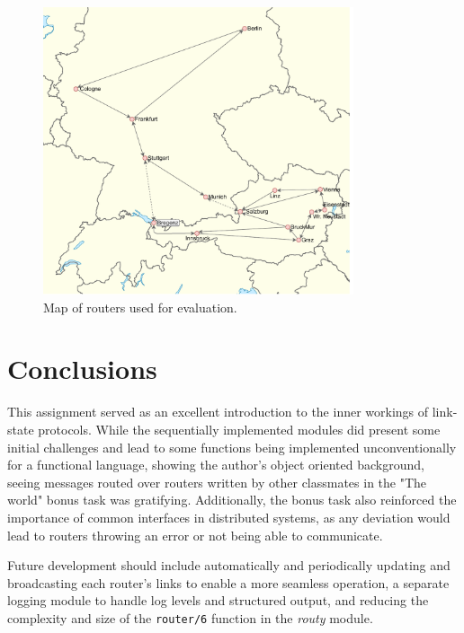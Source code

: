 \documentclass[a4paper, 11pt]{article}
\begin{document}
\begin{figure}[H]
  \begin{center}
    \includegraphics[width=345px]{graphics/map_routy.pdf}
    \caption{Map of routers used for evaluation.}
    \label{fig:map1}
  \end{center}
\end{figure}



\section{Conclusions}

This assignment served as an excellent introduction to the inner workings of link-state protocols.
While the sequentially implemented modules did present some initial challenges and lead to some functions being implemented unconventionally for a functional language, showing the author's object oriented background, seeing messages routed over routers written by other classmates in the "The world" bonus task was gratifying. 
Additionally, the bonus task also reinforced the importance of common interfaces in distributed systems, as any deviation would lead to routers throwing an error or not being able to communicate.

Future development should include automatically and periodically updating and broadcasting each router's links to enable a more seamless operation, a separate logging module to handle log levels and structured output, and reducing the complexity and size of the \texttt{router/6} function in the \textit{routy} module.
\end{document}
